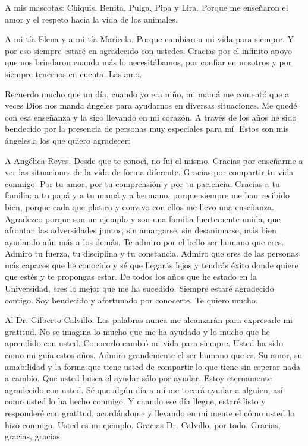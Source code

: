 A mis mascotas: Chiquis, Benita, Pulga, Pipa y Lira. Porque me enseñaron el amor y el respeto hacia la vida de los animales.


A mi tía Elena y a mi tía Maricela. Porque cambiaron mi vida para siempre. Y por eso siempre estaré en agradecido con ustedes. Gracias por el infinito apoyo que nos brindaron cuando más lo necesitábamos, por confiar en nosotros y por siempre tenernos en cuenta. Las amo.


Recuerdo mucho que un día, cuando yo era niño, mi mamá me comentó que a veces Dios nos manda ángeles para ayudarnos en diversas situaciones. Me quedé con esa enseñanza y la sigo llevando en mi corazón. A través de los años he sido bendecido por la presencia de personas muy especiales para mí. Estos son mis ángeles,a  los que quiero agradecer:


A Angélica Reyes. Desde que te conocí, no fui el mismo. Gracias por enseñarme a ver las situaciones de la vida de forma diferente. Gracias por compartir tu vida conmigo. Por tu amor, por tu comprensión y por tu paciencia. Gracias a tu familia: a tu papá y a tu mamá y a hermano, porque siempre me han recibido bien, porque cada que platico y convivo con ellos me llevo una enseñanza. Agradezco porque son un ejemplo y son una familia fuertemente unida, que afrontan las adversidades juntos, sin amargarse, sin desanimarse, más bien ayudando aún más a los demás. Te admiro por el bello ser humano que eres. Admiro tu fuerza, tu disciplina y tu constancia. Admiro que eres de las personas más capaces que he conocido y sé que llegarás lejos y tendrás éxito donde quiere que estés y te propongas estar. De todos los años que he estado en la Universidad, eres lo mejor que me ha sucedido. Siempre estaré agradecido contigo. Soy bendecido y afortunado por conocerte. Te quiero mucho.


Al Dr. Gilberto Calvillo. Las palabras nunca me alcanzarán para expresarle mi gratitud. No se imagina lo mucho que me ha ayudado y lo mucho que he aprendido con usted. Conocerlo cambió mi vida para siempre. Usted ha sido como mi guía estos años. Admiro grandemente el ser humano que es. Su amor, su amabilidad y la forma que tiene usted de compartir lo que tiene sin esperar nada a cambio. Que usted busca el ayudar sólo por ayudar. Estoy eternamente agradecido con usted. Sé que algún día a mí me tocará ayudar a alguien, así como usted lo ha hecho conmigo. Y cuando ese día llegue, estaré listo y responderé con gratitud, acordándome y llevando en mi mente el cómo usted lo hizo conmigo. Usted es mi ejemplo. Gracias Dr. Calvillo, por todo. Gracias, gracias, gracias.


